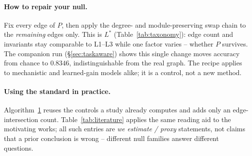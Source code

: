 \documentclass[10pt,twocolumn,letterpaper]{article}
\newcounter{auditbox}
\begin{document}
\begin{figure}[t]\centering{}\label{alg:audit}
\end{figure}

\paragraph{How to repair your null.}\label{sec:repair}
Fix every edge of $P$, then apply the degree- and module-preserving swap chain
to the \emph{remaining} edges only. This is $L^*$ (Table~\ref{tab:taxonomy}):
edge count and invariants stay comparable to L1--L3 while one factor varies --
whether $P$ survives. The companion run (\S\ref{sec:taskaware}) shows this
single change moves accuracy from chance to $0.8346$, indistinguishable from
the real graph. The recipe applies to mechanistic and learned-gain models
alike; it is a control, not a new method.

\paragraph{Using the standard in practice.}
Algorithm~\ref{alg:audit} reuses the controls a study already computes and adds
only an edge-intersection count. Table~\ref{tab:literature} applies the same
reading aid to the motivating works; all such entries are \emph{we estimate /
proxy} statements, not claims that a prior conclusion is wrong -- different
null families answer different questions.
\end{document}
